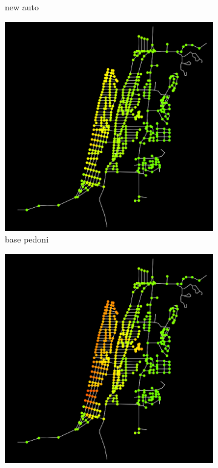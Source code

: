 \begin{figure}
\begin{subfigure}{0.475\textwidth}
        \caption{new auto}
    \end{subfigure}
    \hfill
    \begin{subfigure}{0.475\textwidth}
        \centering
        \includegraphics[width=\textwidth]{images/analisi/comparison-ev-times-map-base-ped.png}
        \caption{base pedoni}
    \end{subfigure}
    \hfill
    \begin{subfigure}{0.475\textwidth}
        \centering
        \includegraphics[width=\textwidth]{images/analisi/comparison-ev-times-map-new-ped.png}

\end{subfigure}
\end{figure}
